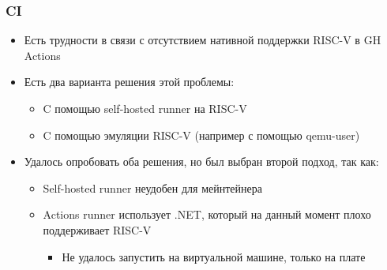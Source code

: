 \documentclass{beamer}
\begin{document}
\begin{frame}[fragile]
	\frametitle{CI}
	\begin{itemize}
		\item Есть трудности в связи с отсутствием нативной поддержки RISC-V в GH Actions
		\item Есть два варианта решения этой проблемы:
		      \begin{itemize}
			      \item C помощью self-hosted runner на RISC-V
			      \item C помощью эмуляции RISC-V (например с помощью qemu-user)
		      \end{itemize}
		\item Удалось опробовать оба решения, но был выбран второй подход, так как:
		      \begin{itemize}
			      \item Self-hosted runner неудобен для мейнтейнера
			      \item Actions runner использует .NET, который на данный момент плохо поддерживает RISC-V
			            \begin{itemize}
				            \item Не удалось запустить на виртуальной машине, только на плате
			            \end{itemize}
		      \end{itemize}
	\end{itemize}
\end{frame}
%
\end{document}
